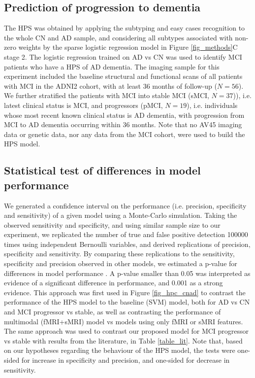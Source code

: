\documentclass[authoryear]{elsarticle}
\begin{document}
\subsection*{Prediction of progression to dementia}
The HPS was obtained by applying the subtyping and easy cases recognition to the whole CN and AD sample, and considering all subtypes associated with non-zero weights by the sparse logistic regression model in Figure \ref{fig_methods}C stage 2. The logistic regression trained on AD vs CN was used to identify MCI patients who have a HPS of AD dementia. The imaging sample for this experiment included the baseline structural and functional scans of all patients with MCI in the ADNI2 cohort, with at least 36 months of follow-up ($N=56$). We further stratified the patients with MCI into stable MCI (sMCI, $N=37$)), i.e. latest clinical status is MCI, and progressors (pMCI, $N=19$), i.e. individuals whose most recent known clinical status is AD dementia, with progression from MCI to AD dementia occurring within 36 months. Note that no AV45 imaging data or genetic data, nor any data from the MCI cohort, were used to build the HPS model.
\subsection*{Statistical test of differences in model performance}
We generated a confidence interval on the performance (i.e. precision, specificity and sensitivity) of a given model using a Monte-Carlo simulation. Taking the observed sensitivity and specificity, and using similar sample size to our experiment, we replicated the number of true and false positive detection 100000 times using independent Bernoulli variables, and derived replications of precision, specificity and sensitivity. By comparing these replications to the sensitivity, specificity and precision observed in other models, we estimated a p-value for differences in model performance \citep{Phipson2010}. A p-value smaller than 0.05 was interpreted as evidence of a significant difference in performance,  and 0.001 as a strong evidence. This approach was first used in Figure \ref{fig_hpc_cnad} to contrast the performance of the HPS model to the baseline (SVM) model, both for AD vs CN and MCI progressor vs stable, as well as contrasting the performance of multimodal (fMRI+sMRI) model vs models using only fMRI or sMRI features. The same approach was used to contrast our proposed model for MCI progressor vs stable with results from the literature, in Table \ref{table_lit}. Note that, based on our hypotheses regarding the behaviour of the HPS model, the tests were one-sided for increase in specificity and precision, and one-sided for decrease in sensitivity. 
\end{document}

